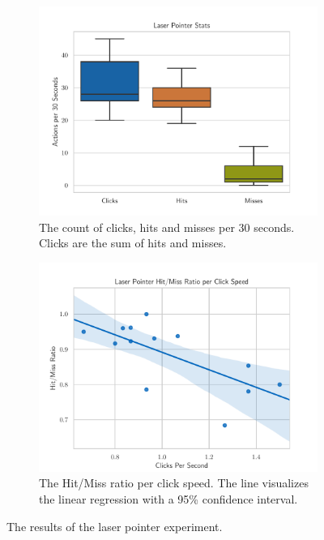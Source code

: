 \begin{figure}[H]
  \centering
  \begin{subfigure}{.45\textwidth}%
    \centering
    \includegraphics[width=\textwidth]{figures/evaluation/eval_exp_lp.pdf}
    \caption{The count of clicks, hits and misses per 30 seconds. Clicks are the sum of hits and misses.}\label{fig:eval-exp-lp}
  \end{subfigure}%
  \hspace{0.1\textwidth}%
  \begin{subfigure}{.45\textwidth}%
    \centering
    \includegraphics[width=\textwidth]{figures/evaluation/eval_exp_lp_ratio_scatter.pdf}
    \caption{The Hit/Miss ratio per click speed. The line visualizes the linear regression with a 95\% confidence interval.}\label{fig:eval-exp-lp-ratio-scatter}
  \end{subfigure}%
  \caption[Laser pointer experiment results]{The results of the laser pointer experiment.}\label{fig:exp-lp-eval}
\end{figure}

